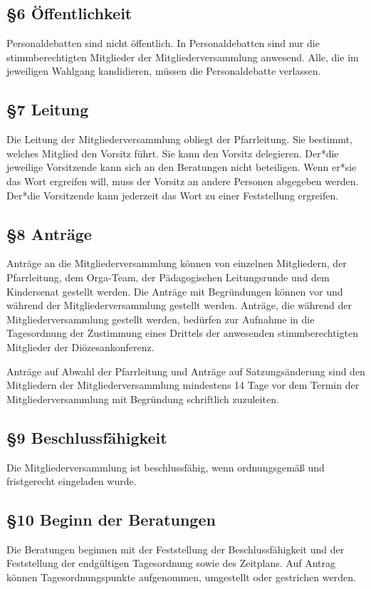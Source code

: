 \documentclass[12pt]{report}
\begin{document}
\begin{justify}
\subsection*{§6 Öffentlichkeit}
Personaldebatten sind nicht öffentlich. In Personaldebatten sind nur die stimmberechtigten Mitglieder der
Mitgliederversammlung anwesend. Alle, die im jeweiligen Wahlgang kandidieren, müssen die Personaldebatte
verlassen.
\subsection*{§7 Leitung}
Die Leitung der Mitgliederversammlung obliegt der Pfarrleitung. Sie bestimmt, welches Mitglied den Vorsitz
führt. Sie kann den Vorsitz delegieren. Der*die jeweilige Vorsitzende kann sich an den Beratungen nicht
beteiligen. Wenn er*sie das Wort ergreifen will, muss der Vorsitz an andere Personen abgegeben werden.
Der*die Vorsitzende kann jederzeit das Wort zu einer Feststellung ergreifen.
\subsection*{§8 Anträge}
Anträge an die Mitgliederversammlung können von einzelnen Mitgliedern, der Pfarrleitung, dem Orga-Team,
der Pädagogischen Leitungsrunde und dem Kindersenat gestellt werden. Die Anträge mit Begründungen
können vor und während der Mitgliederversammlung gestellt werden. Anträge, die während der
Mitgliederversammlung gestellt werden, bedürfen zur Aufnahme in die Tagesordnung der Zustimmung eines Drittels
der anwesenden stimmberechtigten Mitglieder der Diözesankonferenz.

Anträge auf Abwahl der Pfarrleitung und Anträge auf Satzungsänderung sind den Mitgliedern der
Mitgliederversammlung mindestens 14 Tage vor dem Termin der Mitgliederversammlung mit Begründung schriftlich
zuzuleiten.
\subsection*{§9 Beschlussfähigkeit}
Die Mitgliederversammlung ist beschlussfähig, wenn ordnungsgemäß und fristgerecht eingeladen wurde.
\subsection*{§10 Beginn der Beratungen}
Die Beratungen beginnen mit der Feststellung der Beschlussfähigkeit und der Feststellung der endgültigen
Tagesordnung sowie des Zeitplans. Auf Antrag können Tagesordnungspunkte aufgenommen, umgestellt
oder gestrichen werden.

\end{justify}
\end{document}
